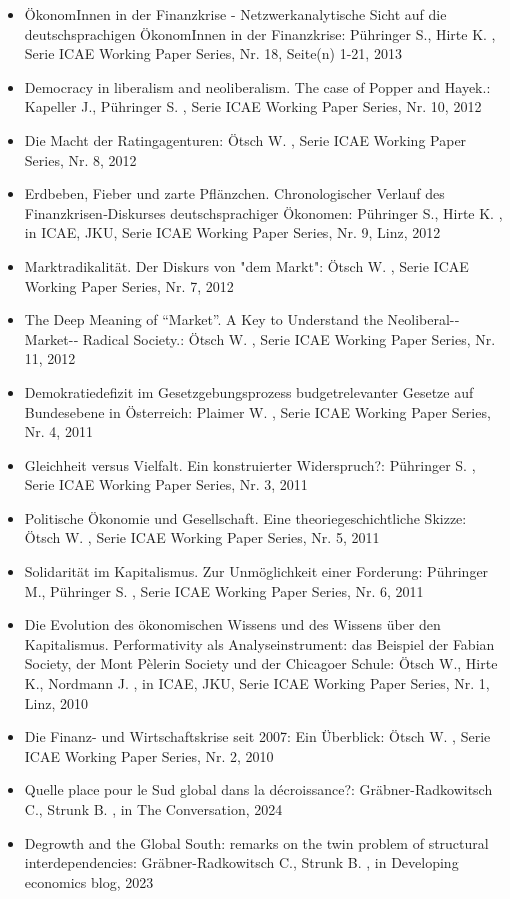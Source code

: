 \begin{itemize}
\item ÖkonomInnen in der Finanzkrise - Netzwerkanalytische Sicht auf die deutschsprachigen ÖkonomInnen in der Finanzkrise: Pühringer S., Hirte K. , Serie ICAE Working Paper Series, Nr. 18, Seite(n) 1-21, 2013
\item Democracy in liberalism and neoliberalism. The case of Popper and Hayek.: Kapeller J., Pühringer S. , Serie ICAE Working Paper Series, Nr. 10, 2012
\item Die Macht der Ratingagenturen: Ötsch W. , Serie ICAE Working Paper Series, Nr. 8, 2012
\item Erdbeben, Fieber und zarte Pflänzchen. Chronologischer Verlauf des Finanzkrisen‐Diskurses deutschsprachiger Ökonomen: Pühringer S., Hirte K. , in ICAE, JKU, Serie ICAE Working Paper Series, Nr. 9, Linz, 2012
\item Marktradikalität. Der Diskurs von "dem Markt": Ötsch W. , Serie ICAE Working Paper Series, Nr. 7, 2012
\item The Deep Meaning of “Market”. A Key to Understand the Neoliberal-­‐Market-­‐ Radical Society.: Ötsch W. , Serie ICAE Working Paper Series, Nr. 11, 2012
\item Demokratiedefizit im Gesetzgebungsprozess budgetrelevanter Gesetze auf Bundesebene in Österreich: Plaimer W. , Serie ICAE Working Paper Series, Nr. 4, 2011
\item Gleichheit versus Vielfalt. Ein konstruierter Widerspruch?: Pühringer S. , Serie ICAE Working Paper Series, Nr. 3, 2011
\item Politische Ökonomie und Gesellschaft. Eine theoriegeschichtliche Skizze: Ötsch W. , Serie ICAE Working Paper Series, Nr. 5, 2011
\item Solidarität im Kapitalismus. Zur Unmöglichkeit einer Forderung: Pühringer M., Pühringer S. , Serie ICAE Working Paper Series, Nr. 6, 2011
\item Die Evolution des ökonomischen Wissens und des Wissens über den Kapitalismus. Performativity als Analyseinstrument: das Beispiel der Fabian Society, der Mont Pèlerin Society und der Chicagoer Schule: Ötsch W., Hirte K., Nordmann J. , in ICAE, JKU, Serie ICAE Working Paper Series, Nr. 1, Linz, 2010
\item Die Finanz-­ und Wirtschaftskrise seit 2007: Ein Überblick: Ötsch W. , Serie ICAE Working Paper Series, Nr. 2, 2010
\item Quelle place pour le Sud global dans la décroissance?: Gräbner-Radkowitsch C., Strunk B. , in The Conversation, 2024
\item Degrowth and the Global South: remarks on the twin problem of structural interdependencies: Gräbner-Radkowitsch C., Strunk B. , in Developing economics blog, 2023

\end{itemize}
